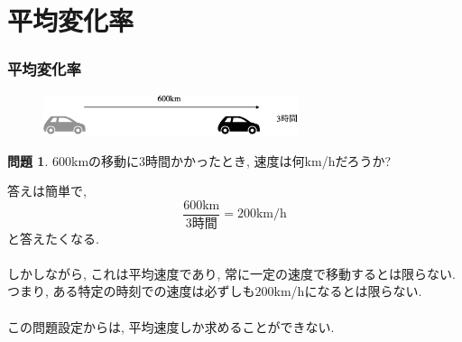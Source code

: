 \documentclass[dvipdfmx,cjk,10.2pt]{beamer}
\theoremstyle{definition}
\newtheorem{Prob}[Thm]{問題}
\begin{document}

\section{平均変化率}

\begin{frame}
\frametitle{平均変化率}

\vspace{-5mm}

 \begin{figure}[htbp]
 \begin{center} 
  \includegraphics[width=75mm]{600km.png}
 \end{center}
\end{figure}

\vspace{-5mm}

\begin{Prob}
$600$kmの移動に$3$時間かかったとき, 速度は何km/hだろうか?
\end{Prob}

答えは簡単で, 
$$
\frac{\text{$600$km}}{\text{$3$時間}}=200\text{km/h}
$$
と答えたくなる. \\
\ \\

しかしながら, これは平均速度であり, 常に一定の速度で移動するとは限らない. 
つまり, ある特定の時刻での速度は必ずしも$200$km/hになるとは限らない. \\
\ \\

この問題設定からは, 平均速度しか求めることができない. 

\end{frame}





\end{document}
